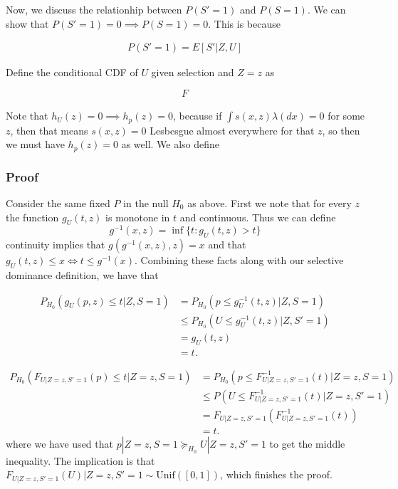 \documentclass{article}
\begin{document}
\begin{appendix}
Now, we discuss the relationhip between $P(S' = 1)$ and $P(S=1)$. We can show that $P(S'=1) = 0 \implies P(S =1) = 0$. This is because 

\begin{align*}
    P(S' = 1) = E[S' | Z, U]
\end{align*}

Define the conditional CDF of $U$ given selection and $Z=z$ as 

\begin{equation*}
    F_{}
\end{equation*}

Note that $h_U(z) = 0 \implies h_p(z) = 0$, because if $\int s(x, z) \lambda(dx) = 0$ for some $z$, then that means $s(x, z) = 0$ Lesbesgue almost everywhere for that $z$, so then we must have $h_p(z) = 0$ as well. We also define 
\fi 


\subsubsection{Proof}
Consider the same fixed $P$ in the null $H_0$ as above. First we note that for every $z$ the function $g_U(t, z)$ is monotone in $t$ and continuous. Thus we can define 
\begin{equation*}
    g^{-1}(x, z)  = \inf \{t: g_U(t, z) > t  \}
\end{equation*}
continuity implies that $g(g^{-1}(x, z), z) = x$ and that $g_{U}(t, z) \leq x \iff t \leq g^{-1}(x)$. Combining these facts along with our selective dominance definition, we have that 

\begin{align*}
    P_{H_0}(g_{U}(p, z) \leq  t |Z, S=1) &= P_{H_0}(p \leq g_U^{-1}(t, z) | Z, S=1) \\
    &\leq P_{H_0}(U \leq g_U^{-1}(t, z) | Z, S'=1) \\
    &= g_U(t, z)\\
    &=t. 
\end{align*}

\begin{align*}
    P_{H_0}(F_{U | Z=z, S' = 1}(p) \leq  t |Z=z, S=1) &= P_{H_0}(p \leq F_{U |Z=z,  S' = 1}^{-1}(t) | Z=z, S=1) \\
    &\leq P(U \leq F_{U |Z=z, S' = 1}^{-1}(t) |Z=z, S'=1) \\
    &=F_{U|Z=z, S'=1}(F_{U|Z=z, S' = 1}^{-1}(t)) \\
    &=t. 
\end{align*}
where we have used that $p | Z=z, S=1 \succeq_{H_0} U |Z=z, S'=1$ to get the middle inequality. The implication is that $F_{U|Z=z, S' = 1}(U) |Z=z, S' = 1 \sim \text{Unif}([0, 1])$, which finishes the proof. 


\end{appendix}
\end{document}
